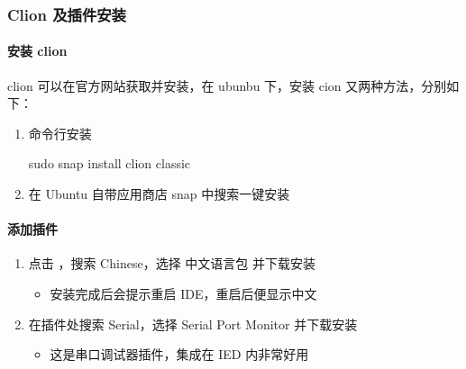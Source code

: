 \documentclass[a4paper,12pt,english]{sphinxmanual}
\begin{document}
\subsubsection{Clion 及插件安装}
\label{\detokenize{exp-esp32/ide/esp-idf-clion-dev:id1}}

\paragraph{安装 clion}
\label{\detokenize{exp-esp32/ide/esp-idf-clion-dev:id2}}
\sphinxAtStartPar
clion 可以在官方网站获取并安装，在 ubunbu 下，安装 cion 又两种方法，分别如下：
\begin{enumerate}
%
\item {} 
\sphinxAtStartPar
命令行安装

\begin{sphinxVerbatim}[commandchars=\\\{\}]
sudo snap install clion \PYGZhy{}\PYGZhy{}classic
\end{sphinxVerbatim}

\item {} 
\sphinxAtStartPar
在 Ubuntu 自带应用商店 snap 中搜索一键安装

\sphinxAtStartPar
{}

\end{enumerate}


\paragraph{添加插件}
\label{\detokenize{exp-esp32/ide/esp-idf-clion-dev:id3}}\begin{enumerate}
%
\item {} 
\sphinxAtStartPar
点击 ，搜索 Chinese，选择 中文语言包 并下载安装
\begin{itemize}
\item {} 
\sphinxAtStartPar
安装完成后会提示重启 IDE，重启后便显示中文

\end{itemize}

\item {} 
\sphinxAtStartPar
在插件处搜索 Serial，选择 Serial Port Monitor 并下载安装
\begin{itemize}
\item {} 
\sphinxAtStartPar
这是串口调试器插件，集成在 IED 内非常好用

\end{itemize}

\end{enumerate}
\end{document}
